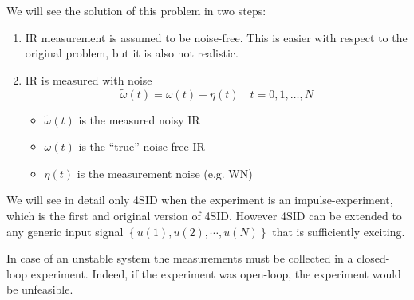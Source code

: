 We will see the solution of this problem in two steps:
\begin{enumerate}
    \item IR measurement is assumed to be noise-free.
    This is easier with respect to the original problem, but it is also not realistic.
    \item IR is measured with noise
    \[ \widetilde{\omega}(t) = \omega(t) + \eta(t) \quad t = 0, 1,\dots, N \]
    \begin{itemize}
        \item $\widetilde{\omega}(t)$ is the measured noisy IR
        \item $\omega(t)$ is the ``true'' noise-free IR
        \item $\eta(t)$ is the measurement noise (e.g. WN)
    \end{itemize}
\end{enumerate}
\begin{remark}
    We will see in detail only 4SID when the experiment is an impulse-experiment, which is the first and original version of 4SID.
    However 4SID can be extended to any generic input signal $\left\{ u(1), u(2), \cdots, u(N) \right\}$ that is sufficiently exciting.
\end{remark}
\begin{remark}
    In case of an unstable system the measurements must be collected in a closed-loop experiment.
    Indeed, if the experiment was open-loop, the experiment would be unfeasible.
\end{remark}